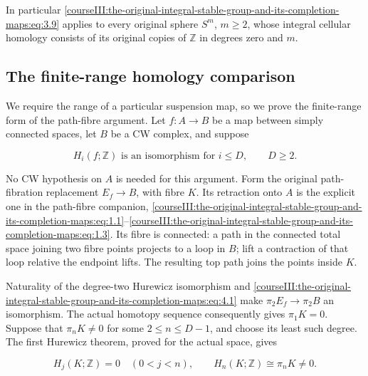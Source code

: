 In particular \eqref{courseIII:the-original-integral-stable-group-and-its-completion-maps:eq:3.9} applies to every original sphere \(S^m\), \(m\geq2\), whose integral cellular homology consists of its original copies of \(\mathbb Z\) in degrees zero and \(m\).

\subsection{The finite-range homology comparison}
\label{courseIII:the-original-integral-stable-group-and-its-completion-maps:integral-finite-range}

\label{courseIII:the-original-integral-stable-group-and-its-completion-maps:section-4}\label{courseIII:integral-stable:4}

We require the range of a particular suspension map, so we prove the finite-range form of the path-fibre argument. Let \(f:A\to B\) be a map between simply connected spaces, let \(B\) be a CW complex, and suppose

\begin{equation}
H_i(f;\mathbb Z)\text{ is an isomorphism for }i\leq D,
 \qquad D\geq2.
 \label{courseIII:the-original-integral-stable-group-and-its-completion-maps:eq:4.1}
\end{equation}

No CW hypothesis on \(A\) is needed for this argument. Form the original path-fibration replacement \(E_f\to B\), with fibre \(K\). Its retraction onto \(A\) is the explicit one in the path-fibre companion, \eqref{courseIII:the-original-integral-stable-group-and-its-completion-maps:eq:1.1}--\eqref{courseIII:the-original-integral-stable-group-and-its-completion-maps:eq:1.3}. Its fibre is connected: a path in the connected total space joining two fibre points projects to a loop in \(B\); lift a contraction of that loop relative the endpoint lifts. The resulting top path joins the points inside \(K\).

Naturality of the degree-two Hurewicz isomorphism and \eqref{courseIII:the-original-integral-stable-group-and-its-completion-maps:eq:4.1} make \(\pi_2E_f\to\pi_2B\) an isomorphism. The actual homotopy sequence consequently gives \(\pi_1K=0\). Suppose that \(\pi_nK\ne0\) for some \(2\leq n\leq D-1\), and choose its least such degree. The first Hurewicz theorem, proved for the actual space, gives

\begin{equation}
H_j(K;\mathbb Z)=0\quad(0<j<n),\qquad
 H_n(K;\mathbb Z)\cong\pi_nK\ne0.
 \label{courseIII:the-original-integral-stable-group-and-its-completion-maps:eq:4.2}
\end{equation}

